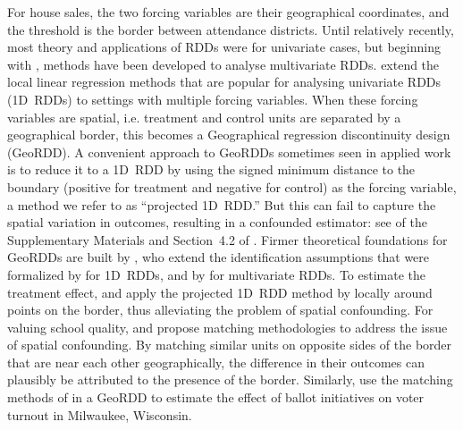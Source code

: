 For house sales, the two forcing variables are their geographical coordinates, and the threshold is the border between attendance districts.
Until relatively recently, most theory and applications of RDDs were for univariate cases,
but beginning with \cite{papay2011extending}, methods have been developed to analyse multivariate RDDs.
\cite{imbens2011regression} extend the local linear regression methods \citep[see][]{imbensrdd} that are popular for analysing univariate RDDs (1D~RDDs) to settings with multiple forcing variables.
When these forcing variables are spatial, i.e. treatment and control units are separated by a geographical border, this becomes a Geographical regression discontinuity design (GeoRDD).
A convenient approach to GeoRDDs sometimes seen in applied work \citep[e.g.][]{macdonald2015effect,chen2013evidence,magruder2012high,holmes1998effect} is to 
reduce it to a 1D~RDD by using the signed minimum distance to the boundary (positive for treatment and negative for control) as the forcing variable, a method we refer to as ``projected 1D~RDD.''
But this can fail to capture the spatial variation in outcomes, resulting in a confounded estimator:
see  of the Supplementary Materials and
Section~4.2 of \cite{keele_titiunik_2015}.
Firmer theoretical foundations for GeoRDDs are built by \cite{keele_titiunik_2015},
who extend the identification assumptions that were formalized by \cite{hahn2001identification} for 1D~RDDs, and by \cite{imbens2011regression} for multivariate RDDs.
To estimate the treatment effect, \cite{keele_titiunik_2015} and \cite{keeleoverview} apply the projected 1D~RDD method by locally around points on the border, thus alleviating the problem of spatial confounding.
For valuing school quality, \citet{gibbons2013valuing} and \citet{fack2010better} propose matching methodologies to address the issue of spatial confounding.
By matching similar units on opposite sides of the border that are near each other geographically, the difference in their outcomes can plausibly be attributed to the presence of the border.
Similarly, \cite{keele2015enhancing} use the matching methods of \cite{zubizarreta2012using} in a GeoRDD to estimate the effect of ballot initiatives on voter turnout in Milwaukee, Wisconsin.

